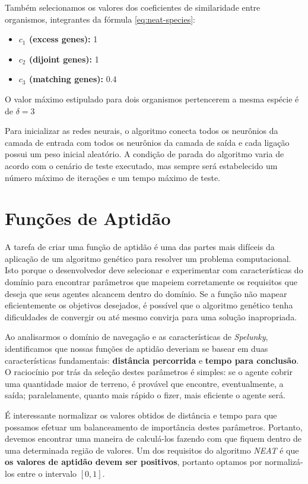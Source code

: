 Também selecionamos os valores dos coeficientes de similaridade entre
organismos, integrantes da fórmula \ref{eq:neat-species}:

\begin{itemize}
	\item \textbf{$c_1$ (excess genes):} 1
	\item \textbf{$c_2$ (dijoint genes):} 1
	\item \textbf{$c_3$ (matching genes):} 0.4
\end{itemize}

O valor máximo estipulado para dois organismos pertencerem a mesma espécie é de
$\delta = 3$

Para inicializar as redes neurais, o algoritmo conecta todos os neurônios da
camada de entrada com todos os neurônios da camada de saída e cada ligação
possui um peso inicial aleatório. A condição de parada do algoritmo varia de
acordo com o cenário de teste executado, mas sempre será estabelecido um número
máximo de iterações e um tempo máximo de teste.


\section{\label{section:modelling-fitness}Funções de Aptidão}
A tarefa de criar uma função de aptidão é uma das partes mais difíceis da
aplicação de um algoritmo genético para resolver um problema computacional. Isto
porque o desenvolvedor deve selecionar e experimentar com características do
domínio para encontrar parâmetros que mapeiem corretamente os requisitos que
deseja que seus agentes alcancem dentro do domínio. Se a função não mapear
eficientemente os objetivos desejados, é possível que o algoritmo genético tenha
dificuldades de convergir ou até mesmo convirja para uma solução inapropriada.

Ao analisarmos o domínio de navegação e as características de \textit{Spelunky},
identificamos que nossas funções de aptidão deveriam se basear em duas
características fundamentais: \textbf{distância percorrida} e \textbf{tempo para
conclusão}. O raciocínio por trás da seleção destes parâmetros é simples: se o
agente cobrir uma quantidade maior de terreno, é provável que encontre,
eventualmente, a saída; paralelamente, quanto mais rápido o fizer, mais
eficiente o agente será.

É interessante normalizar os valores obtidos de distância e tempo para que
possamos efetuar um balanceamento de importância destes parâmetros. Portanto,
devemos encontrar uma maneira de calculá-los fazendo com que fiquem dentro de
uma determinada região de valores. Um dos requisitos do algoritmo \textit{NEAT}
é que \textbf{os valores de aptidão devem ser positivos}, portanto optamos por
normalizá-los entre o intervalo $[0, 1]$.

